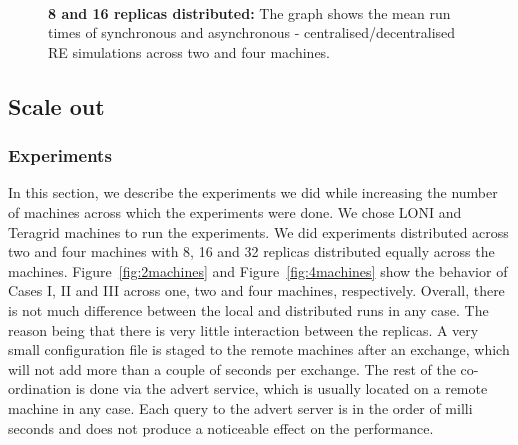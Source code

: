 \documentclass{rspublic}
\begin{document}
%
\begin{figure}%
\centering
{}\qquad
{}\\
\caption{\textbf{8 and 16 replicas distributed:} The graph shows the mean run times of synchronous and
  asynchronous - centralised/decentralised RE simulations across two
  and four machines.}
\label{fig:24machines}
\end{figure}

\subsection{Scale out}

\subsubsection{Experiments}
In this section, we describe the experiments we did while increasing
the number of machines across which the experiments were done. We
chose LONI and Teragrid machines to run the experiments. We did
experiments distributed across two and four machines with 8, 16 and 32
replicas distributed equally across the machines.
Figure~\ref{fig:2machines} and Figure~\ref{fig:4machines} show the
behavior of Cases I, II and III across one, two and four machines,
respectively. Overall, there is not much difference between the local
and distributed runs in any case. The reason being that there is very
little interaction between the replicas. A very small configuration
file is staged to the remote machines after an exchange, which will
not add more than a couple of seconds per exchange. The rest of the
co-ordination is done via the advert service, which is usually located
on a remote machine in any case. Each query to the advert server is in
the order of milli seconds and does not produce a noticeable effect on
the performance.
\end{document}
